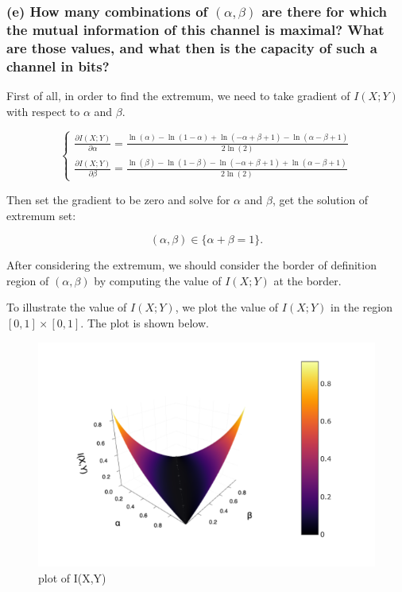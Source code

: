 \hypertarget{e-how-many-combinations-of-alpha-beta-are-there-for-which-the-mutual-information-of-this-channel-is-maximal-what-are-those-values-and-what-then-is-the-capacity-of-such-a-channel-in-bits}{%
\subsubsection{\texorpdfstring{(e) How many combinations of
\((\alpha, \beta)\) are there for which the mutual information of this
channel is maximal? What are those values, and what then is the capacity
of such a channel in
bits?}{(e) How many combinations of (\textbackslash alpha, \textbackslash beta) are there for which the mutual information of this channel is maximal? What are those values, and what then is the capacity of such a channel in bits?}}\label{e-how-many-combinations-of-alpha-beta-are-there-for-which-the-mutual-information-of-this-channel-is-maximal-what-are-those-values-and-what-then-is-the-capacity-of-such-a-channel-in-bits}}

First of all, in order to find the extremum, we need to take gradient of
\(I(X;Y)\) with respect to \(\alpha\) and \(\beta\).

\[
\begin{cases}
\frac{\partial I(X;Y)}{\partial\alpha}=\frac{\ln(α)−\ln(1−α)+\ln(−α+β+1)−\ln(α−β+1)}{2\ln(2)}\\
\frac{\partial I(X;Y)}{\partial\beta}=\frac{\ln(β)−\ln(1−β)−\ln(−α+β+1)+\ln(α−β+1)}{2\ln(2)}
\end{cases}
\]

Then set the gradient to be zero and solve for \(\alpha\) and \(\beta\),
get the solution of extremum set:

\[
(\alpha, \beta) \in \{\alpha+\beta=1\}.
\]

After considering the extremum, we should consider the border of
definition region of \((\alpha, \beta)\) by computing the value of
\(I(X;Y)\) at the border.

To illustrate the value of \(I(X;Y)\), we plot the value of \(I(X;Y)\)
in the region \([0,1]\times[0,1]\). The plot is shown below.

\begin{figure}
\centering
\includegraphics{img/I(X,Y).png}
\caption{plot of I(X,Y)}
\end{figure}

